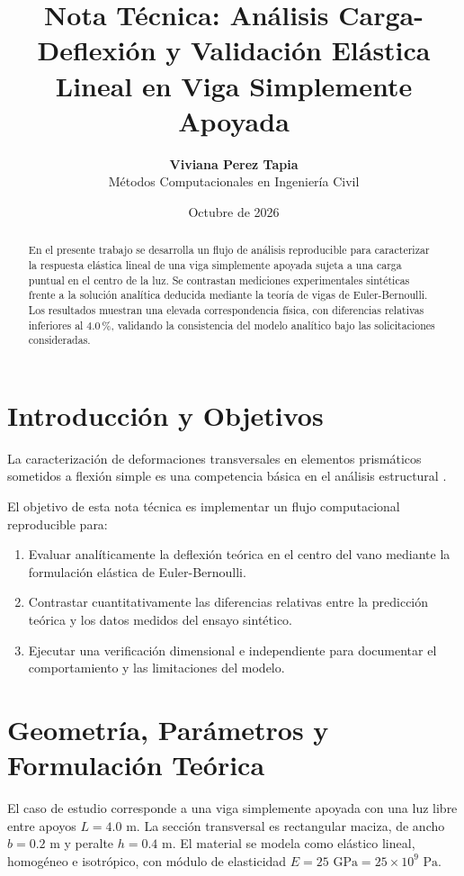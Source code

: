 \documentclass[11pt,letterpaper]{article}
\title{\textbf{Nota Técnica: Análisis Carga-Deflexión y Validación Elástica Lineal en Viga Simplemente Apoyada}}
\author{\textbf{Viviana Perez Tapia} \\ Métodos Computacionales en Ingeniería Civil}
\date{Octubre de 2026}
\begin{document}
\maketitle

\begin{abstract}
En el presente trabajo se desarrolla un flujo de análisis reproducible para caracterizar la respuesta elástica lineal de una viga simplemente apoyada sujeta a una carga puntual en el centro de la luz. Se contrastan mediciones experimentales sintéticas frente a la solución analítica deducida mediante la teoría de vigas de Euler-Bernoulli. Los resultados muestran una elevada correspondencia física, con diferencias relativas inferiores al $4.0\,\%$, validando la consistencia del modelo analítico bajo las solicitaciones consideradas.
\end{abstract}

\section{Introducción y Objetivos}
La caracterización de deformaciones transversales en elementos prismáticos sometidos a flexión simple es una competencia básica en el análisis estructural \cite{hibbeler_mecanica_2017}. 

El objetivo de esta nota técnica es implementar un flujo computacional reproducible para:
\begin{enumerate}
    \item Evaluar analíticamente la deflexión teórica en el centro del vano mediante la formulación elástica de Euler-Bernoulli.
    \item Contrastar cuantitativamente las diferencias relativas entre la predicción teórica y los datos medidos del ensayo sintético.
    \item Ejecutar una verificación dimensional e independiente para documentar el comportamiento y las limitaciones del modelo.
\end{enumerate}

\section{Geometría, Parámetros y Formulación Teórica}
El caso de estudio corresponde a una viga simplemente apoyada con una luz libre entre apoyos $L = 4.0\text{ m}$. La sección transversal es rectangular maciza, de ancho $b = 0.2\text{ m}$ y peralte $h = 0.4\text{ m}$. El material se modela como elástico lineal, homogéneo e isotrópico, con módulo de elasticidad $E = 25\text{ GPa} = 25 \times 10^9\text{ Pa}$.
\end{document}
